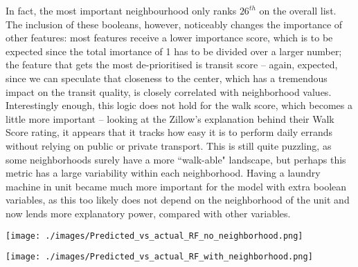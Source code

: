 \documentclass[12pt]{report}
\begin{document}
In fact, the most important neighbourhood only ranks $26^{th}$ on the overall list. The inclusion of these booleans, however, noticeably changes the importance of other features: most features receive a lower importance score, which is to be expected since the total imortance of 1 has to be divided over a larger number; the feature that gets the most de-prioritised is transit score -- again, expected, since we can speculate that closeness to the center, which has a tremendous impact on the transit quality, is closely correlated with neighborhood values. Interestingly enough, this logic does not hold for the walk score, which becomes a little more important -- looking at the Zillow's explanation behind their Walk Score rating, it appears that it tracks how easy it is to perform daily errands without relying on public or private transport. This is still quite puzzling, as some neighborhoods surely have a more ``walk-able" landscape, but perhaps this metric has a large variability within each neighborhood. Having a laundry machine in unit became much more important for the model with extra boolean variables, as this too likely does not depend on the neighborhood of the unit and now lends more explanatory power, compared with other variables.

\begin{minipage}[t]{0.47\textwidth}
	\centering
	\texttt{[image: ./images/Predicted\_vs\_actual\_RF\_no\_neighborhood.png]}
	\label{fig:rf-scatterplot-test-no-neighborhood}
\end{minipage}
\begin{minipage}[t]{0.47\textwidth}
	\centering
	\texttt{[image: ./images/Predicted\_vs\_actual\_RF\_with\_neighborhood.png]}
	\label{fig:rf-scatterplot-test}
\end{minipage}
\end{document}
